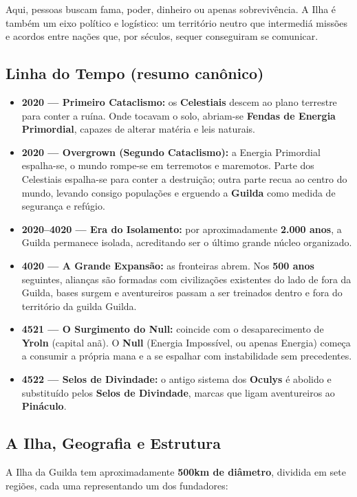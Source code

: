 Aqui, pessoas buscam fama, poder, dinheiro ou apenas sobrevivência. A Ilha é também um eixo político e logístico: um território neutro que intermediá missões e acordos entre nações que, por séculos, sequer conseguiram se comunicar.

\subsection*{Linha do Tempo (resumo canônico)}
\begin{itemize}
    \item \textbf{2020 — Primeiro Cataclismo:} os \textbf{Celestiais} descem ao plano terrestre para conter a ruína. Onde tocavam o solo, abriam-se \textbf{Fendas de Energia Primordial}, capazes de alterar matéria e leis naturais.
    \item \textbf{2020 — Overgrown (Segundo Cataclismo):} a Energia Primordial espalha-se, o mundo rompe-se em terremotos e maremotos. Parte dos Celestiais espalha-se para conter a destruição; outra parte recua ao centro do mundo, levando consigo populações e erguendo a \textbf{Guilda} como medida de segurança e refúgio.
    \item \textbf{2020–4020 — Era do Isolamento:} por aproximadamente \textbf{2.000 anos}, a Guilda permanece isolada, acreditando ser o último grande núcleo organizado.
    \item \textbf{4020 — A Grande Expansão:} as fronteiras abrem. Nos \textbf{500 anos} seguintes, alianças são formadas com civilizações existentes do lado de fora da Guilda, bases surgem e aventureiros passam a ser treinados dentro e fora do território da guilda Guilda.
    \item \textbf{4521 — O Surgimento do Null:} coincide com o desaparecimento de \textbf{Yroln} (capital anã). O \textbf{Null} (Energia Impossível, ou apenas Energia) começa a consumir a própria mana e a se espalhar com instabilidade sem precedentes.
    \item \textbf{4522 — Selos de Divindade:} o antigo sistema dos \textbf{Oculys} é abolido e substituído pelos \textbf{Selos de Divindade}, marcas que ligam aventureiros ao \textbf{Pináculo}.
\end{itemize}

\subsection*{A Ilha, Geografia e Estrutura}
A Ilha da Guilda tem aproximadamente \textbf{500km de diâmetro}, dividida em sete regiões, cada uma representando um dos fundadores:

